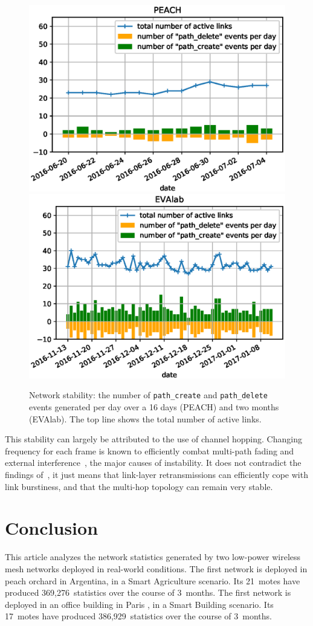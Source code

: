 \documentclass{elsarticle}
\newcommand{\building}            {Smart Building\xspace}
\newcommand{\agri}                {Smart Agriculture\xspace}
\newcommand{\pathcreate}          {{\tt path\_create}\xspace}
\newcommand{\pathdelete}          {{\tt path\_delete}\xspace}
\newcommand{\PEACHNUMSTATS}       {369,276\xspace}
\newcommand{\EVANUMSTATS}         {386,929\xspace}
\begin{document}
\begin{figure}
    \includegraphics[width=0.5\columnwidth]{net_churn_peach.eps}
    \includegraphics[width=0.5\columnwidth]{net_churn.eps}
    \caption{
        Network stability: the number of \pathcreate and \pathdelete events generated per day over a 16 days (PEACH) and two months (EVAlab).
        The top line shows the total number of active links.
    }
    \label{fig:net_churn}
\end{figure}


This stability can largely be attributed to the use of channel hopping.
Changing frequency for each frame is known to efficiently combat multi-path fading and external interference~\cite{watteyne09reliability}, the major causes of instability.
It does not contradict the findings of~\cite{srinivasan08beta}, it just means that link-layer retransmissions can efficiently cope with link burstiness, and that the multi-hop topology can remain very stable.

\section{Conclusion}
\label{sec:conclusion}


This article analyzes the network statistics generated by two low-power wireless mesh networks deployed in real-world conditions.
The first network is deployed in peach orchard in Argentina, in a \agri scenario.
Its 21~motes have produced \PEACHNUMSTATS~statistics over the course of 3~months.
The first network is deployed in an office building in Paris , in a \building scenario.
Its 17~motes have produced \EVANUMSTATS~statistics over the course of 3~months.
\end{document}
